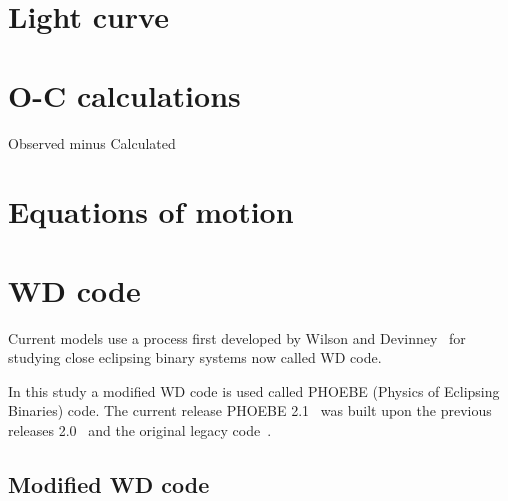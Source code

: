 \section{Light curve}

\section{O-C calculations}
Observed minus Calculated

\section{Equations of motion}



\section{WD code}
Current models use a process first developed by Wilson and Devinney~\cite{wilson_devinney_1971} for studying close eclipsing binary systems now 
called WD code.

In this study a modified WD code is used called PHOEBE (Physics of Eclipsing Binaries) code.
The current release PHOEBE 2.1~\cite{horvat_2018} was built upon the previous releases 2.0~\cite{prsa_2016}
and the original legacy code~\cite{prsa_2005}. 


\subsection{Modified WD code}


